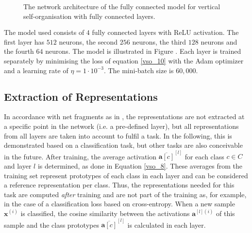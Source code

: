 \begin{figure}[h]
{
}
    \caption[Architecture of the fully connected model with vertical self-organisation]{The network architecture of the fully connected model for vertical self-organisation with fully connected layers.}
\end{figure}

The model used consists of $4$ fully connected layers with ReLU activation. The first layer has $512$ neurons, the second $256$ neurons, the third $128$ neurons and the fourth $64$ neurons. The model is illustrated in Figure . Each layer is trained separately by minimising the loss of equation \eqref{vso_10} with the Adam optimizer and a learning rate of $\eta = 1 \cdot 10^{-3}$. The mini-batch size is $60,000$. 

\subsection{Extraction of Representations}
In accordance with net fragments as in , the representations are not extracted at a specific point in the network (i.e. a pre-defined layer), but all representations from all layers are taken into account to fulfil a task.
In the following, this is demonstrated based on a classification task, but other tasks are also conceivable in the future.
After training, the average activation $\overline{\boldsymbol{a}[c]}^{[l]}
$ for each class $c \in C$ and layer $l$ is determined, as done in Equation \eqref{vso_8}.
These averages from the training set represent prototypes of each class in each layer and can be considered a reference representation per class. Thus, the representations needed for this task are computed \emph{after} training and are not part of the training as, for example, in the case of a classification loss based on cross-entropy.
When a new sample $\boldsymbol{x}^{(i)}$ is classified, the cosine similarity between the activations $\boldsymbol{a}^{[l](i)}$ of this sample and the class prototypes $\overline{\boldsymbol{a}[c]}^{[l]}$ is calculated in each layer.

